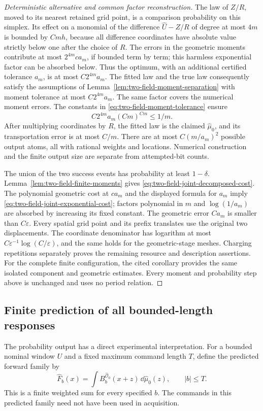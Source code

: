 \begin{proof}[Deterministic alternative and common factor reconstruction]
The law of $Z/R$, moved to its nearest retained grid point, is a
comparison probability on this simplex.  Its effect on a monomial
of the difference $\widehat U-Z/R$ of degree at most $4m$ is bounded
by $Cmh$, because all difference coordinates have absolute value
strictly below one after the choice of $R$.  The errors in the
geometric moments contribute at most $2^{4m}c a_m$, if bounded
term by term; this harmless exponential factor can be absorbed
below.  Thus the optimum, with an additional certified tolerance
$a_m$, is at most $C2^{4m}a_m$.
The fitted law and the true law consequently satisfy the assumptions
of Lemma~\ref{lem:two-field-moment-separation} with moment tolerance
at most $C2^{4m}a_m$.  The same factor covers the numerical moment
errors.  The constants in \eqref{eq:two-field-moment-tolerance}
ensure
\[
                  C2^{4m}a_m(Cm)^{Cm}\le 1/m.
\]
After multiplying coordinates by $R$, the fitted law is the claimed
$\widehat\mu_0$, and its transportation error is at most $C/m$.
There are at most $C(m/a_m)^2$ possible output atoms, all with
rational weights and locations.  Numerical construction and the
finite output size are separate from attempted-bit counts.

The union of the two success events has probability at least
$1-\delta$.  Lemma~\ref{lem:two-field-finite-moments} gives
\eqref{eq:two-field-joint-decomposed-cost}.  The polynomial geometric
cost at $c a_m$ and the displayed formula for $a_m$ imply
\eqref{eq:two-field-joint-exponential-cost}; factors polynomial in
$m$ and $\log(1/a_m)$ are absorbed by increasing its fixed constant.
The geometric error $Ca_m$ is smaller than $C\varepsilon$.
Every spatial grid point and its prefix translates use the original
two displacements.  The coordinate denominator has logarithm at
most $C\varepsilon^{-1}\log(C/\varepsilon)$, and the same holds
for the geometric-stage meshes.  Charging repetitions separately
proves the remaining resource and description assertions.  For the
complete finite configuration, the cited corollary provides the same
isolated component and geometric estimates.  Every moment and
probability step above is unchanged and uses no period relation.
\end{proof}

\subsection{Finite prediction of all bounded-length responses}
The probability output has a direct experimental interpretation.
For a bounded nominal window $U$ and a fixed maximum command length
$T$, define the predicted forward family by
\begin{equation}\label{eq:two-field-predicted-family}
 \widehat F_b(x)=\int B_b^{\widehat{\mathcal O}_0}(x+z)
                                      \,\dd\widehat\mu_0(z),
                                  \qquad |b|\le T.
\end{equation}
This is a finite weighted sum for every specified $b$.  The commands
in this predicted family need not have been used in acquisition.

